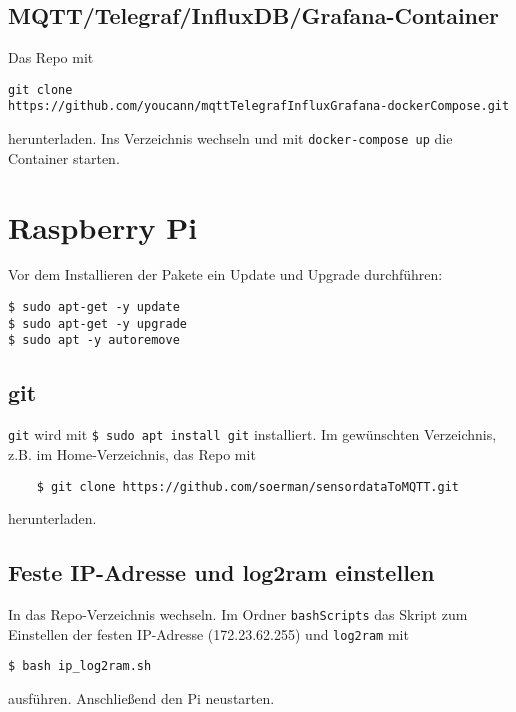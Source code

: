 \subsection{MQTT/Telegraf/InfluxDB/Grafana-Container}
Das Repo mit 
\begin{verbatim}
git clone 
https://github.com/youcann/mqttTelegrafInfluxGrafana-dockerCompose.git
\end{verbatim}
herunterladen. Ins Verzeichnis wechseln und mit \verb|docker-compose up| die Container starten.

\newpage

\section{Raspberry Pi}
Vor dem Installieren der Pakete ein Update und Upgrade durchführen:
\begin{verbatim}
$ sudo apt-get -y update 
$ sudo apt-get -y upgrade
$ sudo apt -y autoremove
\end{verbatim}

\subsection{git}
\texttt{git} wird mit \verb|$ sudo apt install git| installiert.\newline
Im gewünschten Verzeichnis, z.B. im Home-Verzeichnis, das Repo mit 
\begin{verbatim}
	$ git clone https://github.com/soerman/sensordataToMQTT.git
\end{verbatim}
herunterladen. 


\subsection{Feste IP-Adresse und log2ram einstellen}
In das Repo-Verzeichnis wechseln. Im Ordner \verb|bashScripts| das Skript zum Einstellen der festen IP-Adresse (172.23.62.255) und \texttt{log2ram} mit 
\begin{verbatim}
$ bash ip_log2ram.sh
\end{verbatim}
ausführen. Anschließend den Pi neustarten.




